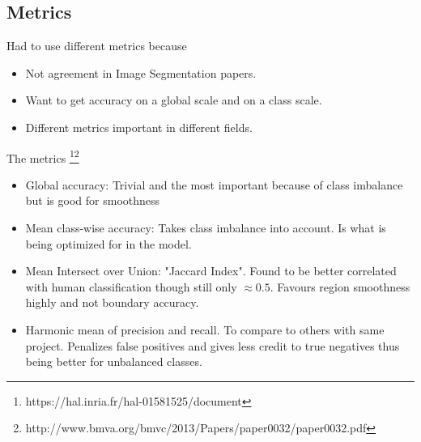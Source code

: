 \documentclass[12pt,fleqn]{article}
\begin{document}
\subsection{Metrics}
Had to use different metrics because
\begin{itemize}
	\item Not agreement in Image Segmentation papers.
	\item Want to get accuracy on a global scale and on a class scale.
	\item Different metrics important in different fields.
\end{itemize}
The metrics \footnote{https://hal.inria.fr/hal-01581525/document}\footnote{
http://www.bmva.org/bmvc/2013/Papers/paper0032/paper0032.pdf} 
\begin{itemize}
	\item Global accuracy: Trivial and  the most important because of class imbalance but is good for smoothness
	\item Mean class-wise accuracy: Takes class imbalance into account. Is what is being optimized for in the model.
	\item Mean Intersect over Union: "Jaccard Index".  Found to be better correlated with human classification though still only \(\approx 0.5\). Favours region smoothness highly and not boundary accuracy.
	\item Harmonic mean of precision and recall. To compare to others with same project. Penalizes false positives and gives less credit to true negatives thus being better for unbalanced classes.
\end{itemize}
\end{document}
